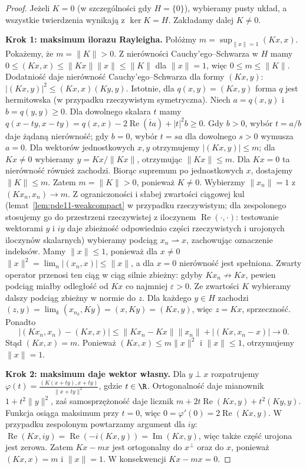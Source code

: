 \begin{proof}
Jeżeli $K=0$ (w szczególności gdy $H=\{0\}$), wybieramy
pusty układ, a wszystkie twierdzenia wynikają z $\ker K=H$.
Zakładamy dalej $K\ne0$.

\textbf{Krok 1: maksimum ilorazu Rayleigha.}
Połóżmy $m=\sup_{\|x\|=1}(Kx,x)$.
Pokażemy, że $m=\|K\|>0$. Z nierówności
Cauchy'ego--Schwarza w $H$ mamy
$0\le (Kx,x)\le\|Kx\|\|x\|\le\|K\|$ dla $\|x\|=1$,
więc $0\le m\le\|K\|$.
Dodatniość daje nierówność Cauchy'ego--Schwarza
dla formy $(Kx,y)$:
$|(Kx,y)|^2\le(Kx,x)(Ky,y)$.
Istotnie, dla $q(x,y)=(Kx,y)$ forma $q$ jest hermitowska
(w przypadku rzeczywistym symetryczna).
Niech $a=q(x,y)$ i $b=q(y,y)\ge0$.
Dla dowolnego skalara $t$ mamy
$q(x-ty,x-ty)=q(x,x)-2\operatorname{Re}(\overline t a)
+|t|^2b\ge0$. Gdy $b>0$, wybór $t=a/b$ daje żądaną
nierówność; gdy $b=0$, wybór $t=sa$ dla dowolnego
$s>0$ wymusza $a=0$.
Dla wektorów jednostkowych $x,y$ otrzymujemy
$|(Kx,y)|\le m$; dla $Kx\ne0$ wybieramy
$y=Kx/\|Kx\|$, otrzymując $\|Kx\|\le m$.
Dla $Kx=0$ ta nierówność również zachodzi.
Biorąc supremum po jednostkowych $x$, dostajemy
$\|K\|\le m$. Zatem $m=\|K\|>0$, ponieważ $K\ne0$.
Wybierzmy $\|x_n\|=1$ z $(Kx_n,x_n)\to m$.
Z ograniczoności i słabej zwartości ciągowej kul
(lemat~\ref{lem:pde11-weakcompact} w przypadku rzeczywistym;
dla zespolonego stosujemy go do przestrzeni rzeczywistej
z iloczynem $\operatorname{Re}(\cdot,\cdot)$: testowanie
wektorami $y$ i $iy$ daje zbieżność odpowiednio części
rzeczywistych i urojonych iloczynów skalarnych)
wybieramy podciąg $x_n\rightharpoonup x$,
zachowując oznaczenie indeksów.
Mamy $\|x\|\le1$, ponieważ dla $x\ne0$
$\|x\|^2=\lim_n |(x_n,x)|\le\|x\|$,
a dla $x=0$ nierówność jest spełniona.
Zwarty operator przenosi ten ciąg w ciąg silnie zbieżny:
gdyby $Kx_n\not\to Kx$, pewien podciąg miałby odległość
od $Kx$ co najmniej $\varepsilon>0$. Ze zwartości $K$
wybieramy dalszy podciąg zbieżny w normie do $z$.
Dla każdego $y\in H$ zachodzi
$(z,y)=\lim_k(x_{n_k},Ky)=(x,Ky)=(Kx,y)$,
więc $z=Kx$, sprzeczność. Ponadto
\[
 |(Kx_n,x_n)-(Kx,x)|\le
 \|Kx_n-Kx\|\|x_n\|+|(Kx,x_n-x)|\longrightarrow0.
\]
Stąd $(Kx,x)=m$.
Ponieważ $(Kx,x)\le m\|x\|^2$ i $\|x\|\le1$,
otrzymujemy $\|x\|=1$.

\textbf{Krok 2: maksimum daje wektor własny.}
Dla $y\perp x$ rozpatrujemy
$\varphi(t)=\frac{(K(x+ty),x+ty)}{\|x+ty\|^2}$,
gdzie $t\in\R$. Ortogonalność daje mianownik
$1+t^2\|y\|^2$, zaś samosprzężoność daje licznik
$m+2t\operatorname{Re}(Kx,y)+t^2(Ky,y)$.
Funkcja osiąga maksimum przy $t=0$, więc
$0=\varphi'(0)=2\operatorname{Re}(Kx,y)$.
W przypadku zespolonym powtarzamy argument dla $iy$:
$\operatorname{Re}(Kx,iy)=\operatorname{Re}(-i(Kx,y))
=\operatorname{Im}(Kx,y)$, więc także część urojona
jest zerowa. Zatem $Kx-mx$ jest ortogonalny do
$x^\perp$ oraz do $x$, ponieważ $(Kx,x)=m$ i $\|x\|=1$.
W konsekwencji $Kx-mx=0$.


\end{proof}
